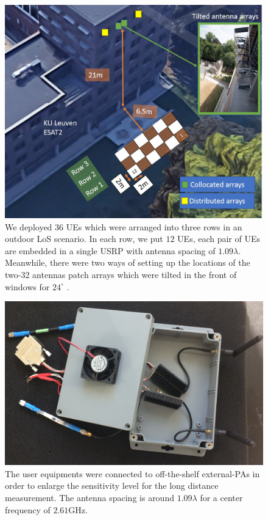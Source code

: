 \begin{figure}[t!]
	\centering
	\includegraphics[width=1.0\linewidth]{figures/outdoor_scenario.jpg}
	\caption{We deployed $36$ UEs which were arranged into three rows in an outdoor LoS scenario. In each row, we put $12$ UEs, each pair of UEs are embedded in a single USRP with antenna spacing of $1.09\lambda$. Meanwhile, there were two ways of setting up the locations of the two-32 antennas patch arrays which were tilted in the front of windows for $24^\circ$ .}
	\label{fig:The measured outdoor scenario}
\end{figure}


\begin{figure}[t!]
	\centering
	\includegraphics[width=1\linewidth]{figures/user_equipment.PNG}
	\caption{The user equipments were connected to off-the-shelf external-PAs in order to enlarge the sensitivity level for the long distance measurement. The antenna spacing is around $1.09\lambda$ for a center frequency of $2.61$GHz.}
	\label{fig:UserEquipment}
\end{figure}

